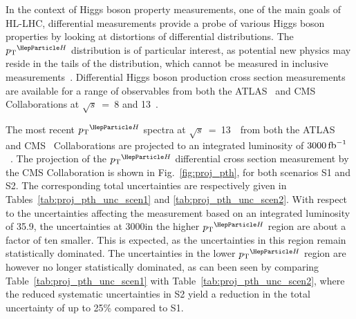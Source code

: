 \label{sec:diffxs}


\noindent In the context of Higgs boson property measurements, one of the main goals of HL-LHC, differential measurements provide a probe of various Higgs boson properties by looking at distortions of differential distributions.
% 
The $\pTH$ distribution is of particular interest, as potential new physics may reside in the tails of the distribution, which cannot be measured in inclusive measurements~\cite{%
Khachatryan:2016vau,%
Aad:2015zhl,%
CMS:2018lkl%
}.
% 
Differential Higgs boson production cross section measurements are available for a range of observables from both the ATLAS~\cite{%
Aad:2014lwa,%
Aad:2014tca,%
Aad:2016lvc,%
Aaboud:2018xdt,%
Aaboud:2017oem,%
Aaboud:2018ezd%
} and CMS~\cite{%
Khachatryan:2015rxa,%
Khachatryan:2015yvw,%
Khachatryan:2016vnn,%
Sirunyan:2018kta,%
Sirunyan:2017exp,
Sirunyan:2018sgc%
} Collaborations at $\sqrt{s}$~=~8 and 13~\UTeV.

The most recent $\pTH$ spectra at $\sqrt{s}$~=~13~\UTeV\ from both the ATLAS~\cite{Aaboud:2018ezd} and CMS~\cite{Sirunyan:2018sgc} Collaborations are projected to an integrated luminosity of $3000\mbox{\ensuremath{\,\text{fb}^\text{$-$1}}}$~\cite{CMS-PAS-FTR-18-011, ATL-PHYS-PUB-2018-040}.
The projection of the $\pTH$ differential cross section measurement by the CMS Collaboration is shown in Fig.~\ref{fig:proj_pth}, for both scenarios S1 and S2. The corresponding total uncertainties are respectively given in Tables~\ref{tab:proj_pth_unc_scen1} and \ref{tab:proj_pth_unc_scen2}. With respect to the uncertainties affecting the measurement based on an integrated luminosity of 35.9\fbinv, the uncertainties at 3000\fbinv in the higher $\pTH$ region are about a factor of ten smaller. This is expected, as the uncertainties in this region remain statistically dominated.
The uncertainties in the lower $\pTH$ region are however no longer statistically dominated, as can been seen by comparing Table~\ref{tab:proj_pth_unc_scen1} with Table~\ref{tab:proj_pth_unc_scen2}, where the reduced systematic uncertainties in S2 yield a reduction in the total uncertainty of up to 25\% compared to S1.

